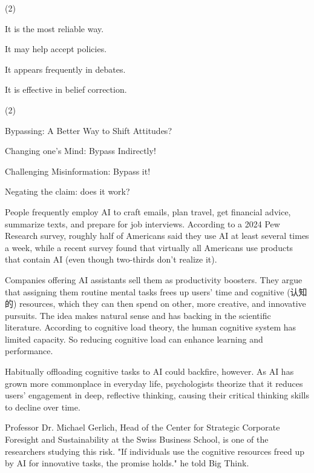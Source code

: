 \documentclass{英语试卷}
\begin{document}
\begin{choices}(2)
  \item It is the most reliable way.
  \item It may help accept policies.
  \item It appears frequently in debates.
  \item It is effective in belief correction.
\end{choices}
\begin{choices}(2)
  \item Bypassing: A Better Way to Shift Attitudes?
  \item Changing one's Mind: Bypass Indirectly!
  \item Challenging Misinformation: Bypass it!
  \item Negating the claim: does it work?
\end{choices}
\par People frequently employ AI to craft emails, plan travel, get financial advice, summarize texts, and prepare for job interviews. According to a 2024 Pew Research survey, roughly half of Americans said they use AI at least several times a week, while a recent survey found that virtually all Americans use products that contain AI (even though two-thirds don't realize it).\par
\par Companies offering AI assistants sell them as productivity boosters. They argue that assigning them routine mental tasks frees up users' time and cognitive (认知的) resources, which they can then spend on other, more creative, and innovative pursuits. The idea makes natural sense and has backing in the scientific literature. According to cognitive load theory, the human cognitive system has limited capacity. So reducing cognitive load can enhance learning and performance.\par
\par Habitually offloading cognitive tasks to AI could backfire, however. As AI has grown more commonplace in everyday life, psychologists theorize that it reduces users' engagement in deep, reflective thinking, causing their critical thinking skills to decline over time.\par
\par Professor Dr. Michael Gerlich, Head of the Center for Strategic Corporate Foresight and Sustainability at the Swiss Business School, is one of the researchers studying this risk. "If individuals use the cognitive resources freed up by AI for innovative tasks, the promise holds." he told Big Think.\par
\end{document}
